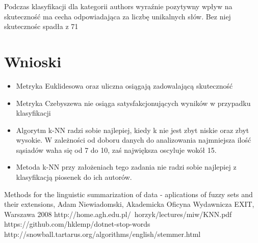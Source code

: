 \documentclass{classrep}
\begin{document}
Podczas klasyfikacji dla kategorii authors wyraźnie pozytywny wpływ na skuteczność ma cecha odpowiadająca za liczbę unikalnych słów. Bez niej skutecznośc spadła z 71%

	
\section{Wnioski}
\begin{itemize}
	\item Metryka Euklidesowa oraz uliczna osiągają zadowalającą skuteczność
	\item Metryka Czebyszewa nie osiąga satysfakcjonujących wyników w przypadku klasyfikacji
	\item Algorytm k-NN radzi sobie najlepiej, kiedy k nie jest zbyt niskie oraz zbyt wysokie. W zależności od doboru danych do analizowania najmniejsza ilość sąsiadów waha się od 7 do 10, zaś największa oscyluje wokół 15.
	\item Metoda k-NN przy założeniach tego zadania nie radzi sobie najlepiej z klasyfikacją piosenek do ich autorów.
\end{itemize}

	

\begin{thebibliography}{}
Methods for the linguistic summarization of data - aplications of fuzzy sets and their extensions, Adam Niewiadomski, Akademicka Oficyna Wydawnicza EXIT, Warszawa 2008
http://home.agh.edu.pl/~horzyk/lectures/miw/KNN.pdf
https://github.com/hklemp/dotnet-stop-words
http://snowball.tartarus.org/algorithms/english/stemmer.html
\end{thebibliography}
\end{document}
